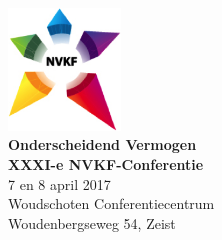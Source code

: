 \documentclass[a4paper,10pt]{report}
\begin{document}
\begin{multicols*}{3}

\noindent
\begin{center}
\includegraphics[width=3cm]{nvkf_logo}\\
{\bfseries Onderscheidend Vermogen}\\ \vspace{0.10cm} 
{\bfseries XXXI-e NVKF-Conferentie}\\ \vspace{0.10cm}
{7 en 8 april 2017}\\ \vspace{0.15cm}
{Woudschoten Conferentiecentrum}\\
{Woudenbergseweg 54, Zeist}
\end{center}
\vfill



\end{multicols*}
\end{document}
